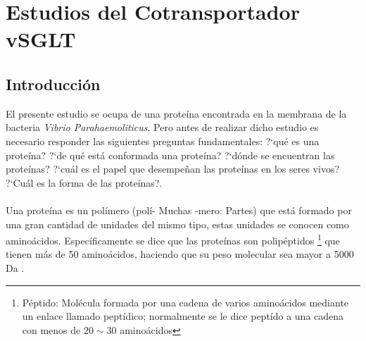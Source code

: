 \chapter{Estudios del Cotransportador vSGLT}
\section{Introducci\'{o}n}
El presente estudio se ocupa de una prote\'{i}na encontrada en la membrana de la bacteria \textit{Vibrio Parahaemoliticus}. Pero antes de realizar dicho estudio es necesario responder las siguientes preguntas fundamentales: ?`qu\'{e} es una prote\'{i}na? ?`de qu\'{e} est\'{a} conformada una prote\'{i}na? ?`d\'{o}nde se encuentran las prote\'{i}nas? ?`cu\'{a}l es el papel que desempe\~{n}an las prote\'{i}nas en los seres vivos? ?`Cu\'{a}l es la forma de las prote\'{i}nas?.\\ \\

Una prote\'{i}na es un pol\'{i}mero (pol\'{i}- Muchas -mero: Partes) que est\'{a} formado por una gran cantidad de unidades del mismo tipo, estas unidades se conocen como amino\'{a}cidos. Espec\'{i}ficamente se dice que las prote\'{i}nas son polip\'{e}ptidos \footnote{P\'{e}ptido: Mol\'{e}cula formada por una cadena de varios amino\'{a}cidos mediante un enlace llamado pept\'{i}dico; normalmente se le dice pept\'{i}do a una cadena con menos de $20\sim30$  amino\'{a}cidos} que tienen m\'{a}s de 50 amino\'{a}cidos, haciendo que su peso molecular sea mayor a 5000 Da \cite{Kuchel}.\\

